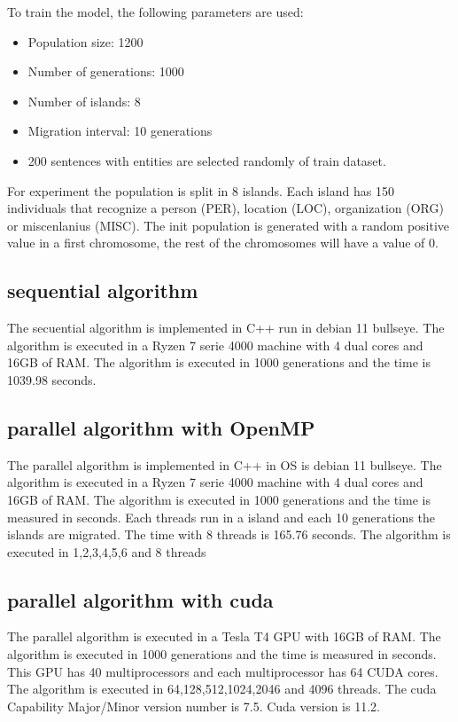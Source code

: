 \documentclass{IEEEtran}
\begin{document}
To train the model, the following parameters are used:
\begin{itemize}
  \item Population size: 1200
  \item Number of generations: 1000
  \item Number of islands: 8
  \item Migration interval: 10 generations
  \item 200 sentences with entities are selected randomly of train dataset.
\end{itemize}

For experiment the population is split in 8 islands. Each island has 150 individuals that recognize a person (PER), location (LOC), organization (ORG) or miscenlanius (MISC). The init population is generated with a random positive value in a first chromosome, the rest of the chromosomes will have a value of 0.

\subsection{sequential algorithm}

The secuential algorithm is implemented in C++ run in debian 11 bullseye. The algorithm is executed in a Ryzen 7 serie 4000 machine with 4 dual cores and 16GB of RAM. The algorithm is executed in 1000 generations and the time is 1039.98 seconds.

\subsection{parallel algorithm with OpenMP}

The parallel algorithm is implemented in C++ in OS is debian 11 bullseye. The algorithm is executed in a Ryzen 7 serie 4000 machine with 4 dual cores and 16GB of RAM. The algorithm is executed in 1000 generations and the time is measured in seconds. Each threads run in a island and each 10 generations the islands are migrated. The time with 8 threads is 165.76 seconds. The algorithm is executed in 1,2,3,4,5,6 and 8 threads

\subsection{parallel algorithm with cuda}

The parallel algorithm is executed in a Tesla T4 GPU with 16GB of RAM. The algorithm is executed in 1000 generations and the time is measured in seconds. This GPU has 40 multiprocessors and each multiprocessor has 64 CUDA cores. The algorithm is executed in 64,128,512,1024,2046 and 4096 threads. The cuda Capability Major/Minor version number is 7.5. Cuda version is 11.2.
\end{document}
